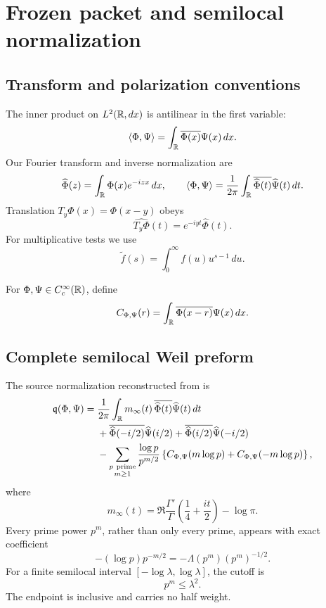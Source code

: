 \section{Frozen packet and semilocal normalization}
\label{sec:packet}

\subsection{Transform and polarization conventions}

The inner product on \(L^2(\mathbb R,dx)\) is antilinear in the first variable:
\[
\langle\Phi,\Psi\rangle
=\int_{\mathbb R}\overline{\Phi(x)}\Psi(x)\,dx.
\]
Our Fourier transform and inverse normalization are
\[
\widehat\Phi(z)=\int_{\mathbb R}\Phi(x)e^{-izx}\,dx,
\qquad
\langle\Phi,\Psi\rangle
=\frac{1}{2\pi}\int_{\mathbb R}
\overline{\widehat\Phi(t)}\widehat\Psi(t)\,dt.
\]
Translation \(T_y\Phi(x)=\Phi(x-y)\) obeys
\[
\widehat{T_y\Phi}(t)=e^{-iyt}\widehat\Phi(t).
\]
For multiplicative tests we use
\[
\widetilde f(s)=\int_0^\infty f(u)u^{s-1}\,du.
\]

For \(\Phi,\Psi\in C_c^\infty(\mathbb R)\), define
\[
C_{\Phi,\Psi}(r)
=\int_{\mathbb R}\overline{\Phi(x-r)}\Psi(x)\,dx.
\]

\subsection{Complete semilocal Weil preform}

The source normalization reconstructed from
\cite{ConnesConsani2023,CCM2025} is
\begin{align}
\mathfrak q(\Phi,\Psi)
={}&
\frac{1}{2\pi}\int_{\mathbb R}
m_\infty(t)\,
\overline{\widehat\Phi(t)}\widehat\Psi(t)\,dt
\notag\\
&+
\overline{\widehat\Phi(-i/2)}\widehat\Psi(i/2)
+
\overline{\widehat\Phi(i/2)}\widehat\Psi(-i/2)
\notag\\
&-
\sum_{\substack{p\ {\rm prime}\\m\ge1}}
\frac{\log p}{p^{m/2}}
\left\{
C_{\Phi,\Psi}(m\log p)
+
C_{\Phi,\Psi}(-m\log p)
\right\},
\label{eq:preform}
\end{align}
where
\[
m_\infty(t)
=
\Re\frac{\Gamma'}{\Gamma}
\left(\frac14+\frac{it}{2}\right)-\log\pi.
\]
Every prime power \(p^m\), rather than only every prime, appears with exact
coefficient
\[
-(\log p)p^{-m/2}
=-\Lambda(p^m)(p^m)^{-1/2}.
\]
For a finite semilocal interval \([-\log\lambda,\log\lambda]\), the cutoff is
\[
p^m\le\lambda^2.
\]
The endpoint is inclusive and carries no half weight.

